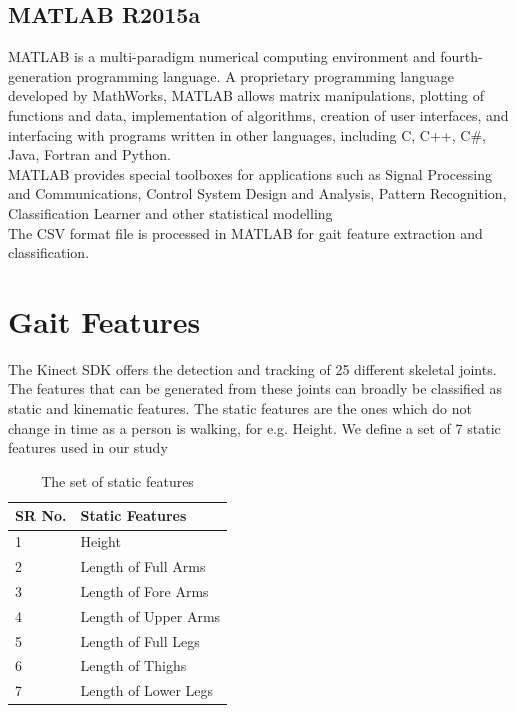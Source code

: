 \subsection{MATLAB R2015a }\label{MATLAB R2015a }
\noindent MATLAB is a multi-paradigm numerical computing environment and fourth-generation programming language. A proprietary programming language developed by MathWorks, MATLAB allows matrix manipulations, plotting of functions and data, implementation of algorithms, creation of user interfaces, and interfacing with programs written in other languages, including C, C++, C\#, Java, Fortran and Python.\\
MATLAB provides special toolboxes for applications such as Signal Processing and Communications, Control System Design and Analysis, Pattern Recognition, Classification Learner and other statistical modelling \\
The CSV format file is processed in MATLAB for gait feature extraction and classification. 

\section{Gait Features} \label{Gait Features } 
\noindent The Kinect SDK offers the detection and tracking of 25 different skeletal joints. The features that can be generated from these joints can broadly be classified as static and kinematic features.
The static features are the ones which do not change in time as a person is walking, for e.g. Height.
We define a set of 7 static features used in our study


\begin{table}
\centering
\begin{tabular}{| l | |p{5cm}|}
 \hline
SR No. & Static Features  \\ \hline
1 & Height \\ \hline
2 & Length of Full Arms \\ \hline
3 & Length of Fore Arms \\\hline
4 & Length of Upper Arms \\ \hline
5 & Length of Full Legs \\ \hline
6 & Length of Thighs \\\hline
7 & Length of Lower Legs \\ \hline

\end{tabular}
\caption{The set of static features}
\end{table}




